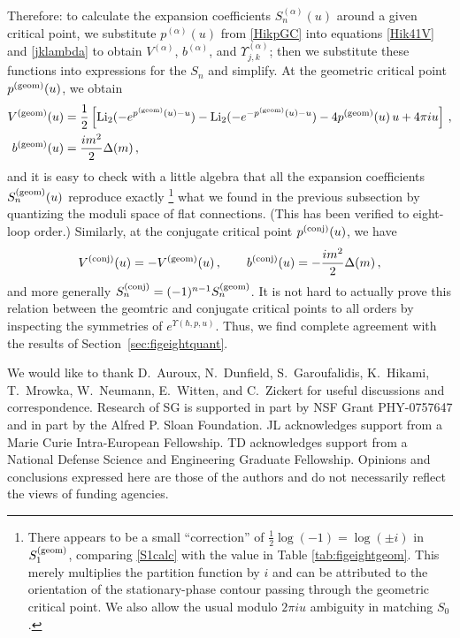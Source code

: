 \documentclass[hyper]{JHEP3}
\newcommand\be{\begin{equation}}
\newcommand\ee{\end{equation}}
\def\Li{\text{Li}_2}
\begin{document}
Therefore: to calculate the expansion coefficients $S_n^{(\alpha)} (u)$
around a given critical point, we substitute $p^{(\alpha)}(u)$ from \eqref{HikpGC}
into equations \eqref{Hik41V} and \eqref{jklambda} to obtain $V^{(\alpha)}$,
$b^{(\alpha)}$, and $\Upsilon_{j,k}^{(\alpha)}$;
then we substitute these functions into expressions for the $S_n$ and simplify.
At the geometric critical point $p^{({\rm geom})}(u)$, we obtain
\begin{align}
V^{({\rm geom})}(u) &= \frac{1}{2}\left[\Li(-e^{p^{(\rm geom)}(u)-u})-\Li(-e^{-p^{(\rm geom)}(u)-u})-4p^{(\rm geom)}(u)\, u + 4\pi i u\right]\,,\\
b^{({\rm geom})}(u) &= \frac{im^2}{2} \Delta(m)\,,
\end{align}
and it is easy to check with a little algebra that all the expansion coefficients $S_n^{({\rm geom})}(u)$
reproduce exactly%
%
\footnote{There appears to be a small ``correction'' of $\frac{1}{2}\log(-1) = \log(\pm i)$ in $S_1^{(\rm geom)}$, comparing \eqref{S1calc} with the value in Table \ref{tab:figeightgeom}. This merely multiplies the partition function by $i$ and can be attributed to the orientation of the stationary-phase contour passing through the geometric critical point. We also allow the usual modulo $2\pi i u$ ambiguity in matching $S_0$.} %
%
what we found in the previous subsection by quantizing
the moduli space of flat connections. (This has been verified to eight-loop order.)
%
%
Similarly, at the conjugate critical point $p^{({\rm conj})}(u)$, we have
\be
V^{({\rm conj})} (u) = -V^{({\rm geom})} (u)\,, \qquad
b^{({\rm conj})} (u) = -\frac{im^2}{2}\Delta(m)\,,
\ee
and more generally $S_n^{(\rm conj)}=(-1)^{n-1}S_n^{(\rm geom)}$. It is not hard to actually prove this relation between the geomtric and conjugate critical points
to all orders by inspecting the symmetries of $e^{\Upsilon(\hbar,p,u)}$.
Thus, we find complete
agreement with the results of Section~\ref{sec:figeightquant}.


\acknowledgments

We would like to thank D.~Auroux, N.~Dunfield, S.~Garoufalidis, K.~Hikami,
T.~Mrowka, W.~Neumann, E.~Witten, and C.~Zickert for useful discussions and correspondence.
Research of SG is supported in part by NSF Grant PHY-0757647
and in part by the Alfred P. Sloan Foundation.
JL acknowledges support from a Marie Curie Intra-European Fellowship.
TD acknowledges support from a National Defense Science and Engineering Graduate Fellowship.
Opinions and conclusions expressed here are those of the authors
and do not necessarily reflect the views of funding agencies.
\end{document}
